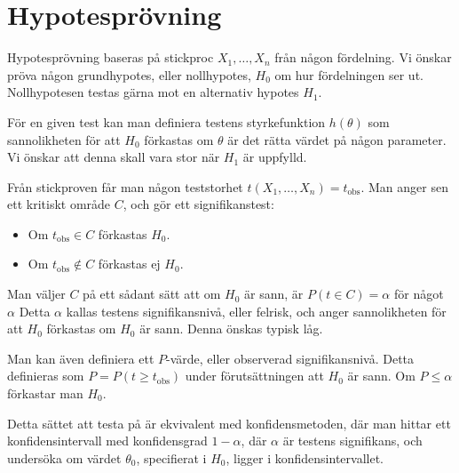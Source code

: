 \section{Hypotesprövning}
Hypotesprövning baseras på stickproc $X_1, \dots, X_n$ från någon fördelning. Vi önskar pröva någon grundhypotes, eller nollhypotes, $H_0$ om hur fördelningen ser ut. Nollhypotesen testas gärna mot en alternativ hypotes $H_1$.

För en given test kan man definiera testens styrkefunktion $h(\theta)$ som sannolikheten för att $H_0$ förkastas om $\theta$ är det rätta värdet på någon parameter. Vi önskar att denna skall vara stor när $H_1$ är uppfylld.

Från stickproven får man någon teststorhet $t(X_1, \dots, X_n) = t_\text{obs}$. Man anger sen ett kritiskt område $C$, och gör ett signifikanstest:
\begin{itemize}
	\item Om $t_\text{obs}\in C$ förkastas $H_0$.
	\item Om $t_\text{obs}\not\in C$ förkastas ej $H_0$.
\end{itemize}
Man väljer $C$ på ett sådant sätt att om $H_0$ är sann, är $P(t\in C) = \alpha$ för något $\alpha$ Detta $\alpha$ kallas testens signifikansnivå, eller felrisk, och anger sannolikheten för att $H_0$ förkastas om $H_0$ är sann. Denna önskas typisk låg.

Man kan även definiera ett $P$-värde, eller observerad signifikansnivå. Detta definieras som $P = P(t\geq t_\text{obs})$ under förutsättningen att $H_0$ är sann. Om $P\leq\alpha$ förkastar man $H_0$.

Detta sättet att testa på är ekvivalent med konfidensmetoden, där man hittar ett konfidensintervall med konfidensgrad $1 - \alpha$, där $\alpha$ är testens signifikans, och undersöka om värdet $\theta_0$, specifierat i $H_0$, ligger i konfidensintervallet.